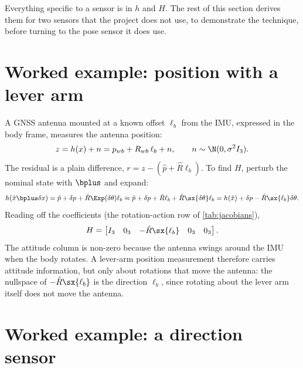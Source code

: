 Everything specific to a sensor is in $h$ and $H$. The rest of this section derives them for two sensors that the
project does not use, to demonstrate the technique, before turning to the pose sensor it does use.

\section{Worked example: position with a lever arm}

A GNSS antenna mounted at a known offset $\ell_b$ from the IMU, expressed in the body frame, measures the
antenna position:
\begin{equation}
  z = h(x) + n = p_{wb} + R_{wb}\,\ell_b + n, \qquad n \sim \N(0, \sigma^2I_3).
\end{equation}
The residual is a plain difference, $r = z - (\hat p + \hat R\ell_b)$. To find $H$, perturb the nominal state with
$\bplus$ and expand:
\begin{equation*}
  h(\hat x\bplus\delta x) = \hat p + \delta p + \hat R\Exp(\delta\theta)\ell_b
  \approx \hat p + \delta p + \hat R\ell_b + \hat R\sx{\delta\theta}\ell_b
  = h(\hat x) + \delta p - \hat R\sx{\ell_b}\delta\theta .
\end{equation*}
Reading off the coefficients (the rotation-action row of \cref{tab:jacobians}),
\begin{equation}
  H = \begin{bmatrix} I_3 & 0_3 & -\hat R\sx{\ell_b} & 0_3 & 0_3 \end{bmatrix}.
\end{equation}
The attitude column is non-zero because the antenna swings around the IMU when the body rotates. A
lever-arm position measurement therefore carries attitude information, but only about rotations that move
the antenna: the nullspace of $-\hat R\sx{\ell_b}$ is the direction $\ell_b$, since rotating about the lever arm itself
does not move the antenna.

\section{Worked example: a direction sensor}

